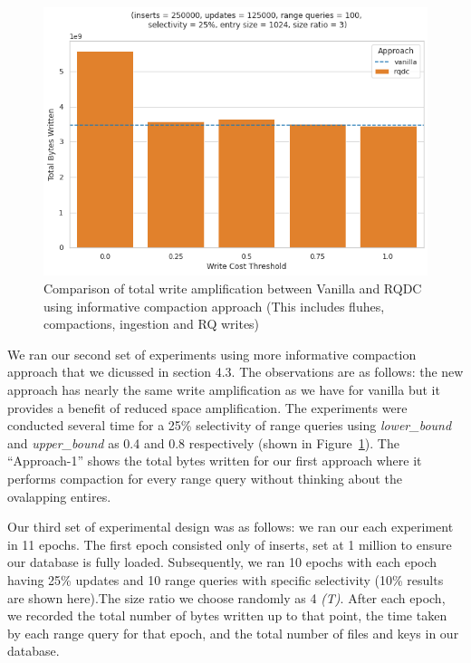 \begin{figure}
    \includegraphics[scale=0.34]{Figures/utl_ltu_approach.png}
    \caption{Comparison of total write amplification between Vanilla and RQDC using informative compaction approach 
    (This includes fluhes, compactions, ingestion and RQ writes)}\label{fig:utl_ltu_approach}
\end{figure}

We ran our second set of experiments using more informative compaction approach that we dicussed in section 4.3. The 
observations are as follows: the new approach has nearly the same write amplification as we have for vanilla but 
it provides a benefit of reduced space amplification. The experiments were conducted several time for a 25\% selectivity 
of range queries using \textit{lower\_bound} and \textit{upper\_bound} as 0.4 and 0.8 respectively (shown in 
Figure~\ref{fig:utl_ltu_approach}). The ``Approach-1'' shows the total bytes written for our first approach where it 
performs compaction for every range query without thinking about the ovalapping entires.

Our third set of experimental design was as follows: we ran our each experiment in 11 epochs. The first epoch consisted only 
of inserts, set at 1 million to ensure our database is fully loaded. Subsequently, we ran 10 epochs with each epoch having 
25\% updates and 10 range queries with specific selectivity (10\% results are shown here).The size ratio we choose randomly as 4 \textit{(T)}. 
After each epoch, we recorded the total number of bytes written up to that point, the time taken by each range query for 
that epoch, and the total number of files and keys in our database. 

